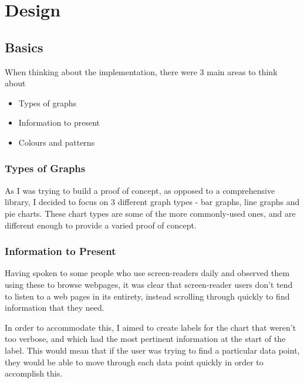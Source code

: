 \documentclass[ %
                    author={Aleena Baig},
                supervisor={Dr Simon Lock},
                    degree={BSc},
                     title={On Making Web Accessible Graphs},
                  subtitle={},
                      year={2019} ]{dissertation}
\begin{document}

\chapter{Design}

\section{Basics}

When thinking about the implementation, there were 3 main areas to think about

\begin{itemize}
    \item Types of graphs
    \item Information to present
    \item Colours and patterns
\end{itemize}

\subsection{Types of Graphs}

As I was trying to build a proof of concept, as opposed to a comprehensive library, I decided to focus on 3 different graph types - bar graphs, line graphs and pie charts. These chart types are some of the more commonly-used ones, and are different enough to provide a varied proof of concept.


\subsection{Information to Present}

Having spoken to some people who use screen-readers daily and observed them using these to browse webpages, it was clear that screen-reader users don't tend to listen to a web pages in its entirety, instead scrolling through quickly to find information that they need.

In order to accommodate this, I aimed to create labels for the chart that weren't too verbose, and which had the most pertinent information at the start of the label. This would mean that if the user was trying to find a particular data point, they would be able to move through each data point quickly in order to accomplish this.
\end{document}
